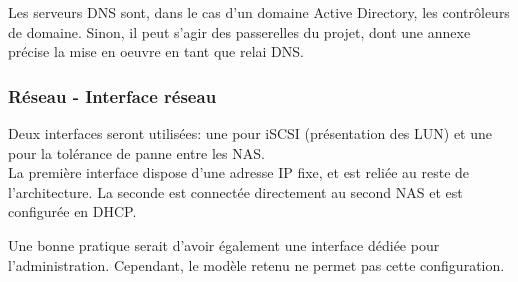 Les serveurs DNS sont, dans le cas d'un domaine Active Directory, les contrôleurs de domaine. Sinon, il peut s'agir des passerelles du projet, dont une annexe précise la mise en oeuvre en tant que relai DNS.

\subsubsection{Réseau - Interface réseau}
Deux interfaces seront utilisées: une pour iSCSI (présentation des LUN) et une pour la tolérance de panne entre les NAS.\\

La première interface dispose d'une adresse IP fixe, et est reliée au reste de l'architecture. La seconde est connectée directement au second NAS et est configurée en DHCP.

\begin{tip}
Une bonne pratique serait d'avoir également une interface dédiée pour l'administration. Cependant, le modèle retenu ne permet pas cette configuration.
\end{tip}